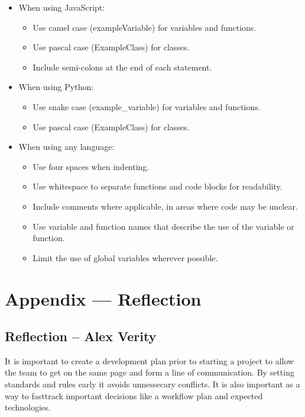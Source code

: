 \documentclass{article}
\begin{document}
\begin{itemize}
  \item When using JavaScript:
  \begin{itemize}
    \item Use camel case (exampleVariable) for variables and functions.
    \item Use pascal case (ExampleClass) for classes.
    \item Include semi-colons at the end of each statement.
  \end{itemize}
  \item When using Python:
  \begin{itemize}
    \item Use snake case (example\_variable) for variables and functions.
    \item Use pascal case (ExampleClass) for classes.
  \end{itemize}
  \item When using any language:
  \begin{itemize}
    \item Use four spaces when indenting.
    \item Use whitespace to separate functions and code blocks for readability.
    \item Include comments where applicable, in areas where code may be unclear.
    \item Use variable and function names that describe the use of the variable
    or function.
    \item Limit the use of global variables wherever possible.
  \end{itemize}
\end{itemize}


\newpage{}

\section*{Appendix --- Reflection}

\subsection*{Reflection -- Alex Verity}

It is important to create a development plan prior to starting a project to
allow the team to get on the same page and form a line of communication. By
setting standards and rules early it avoids unnessecary conflicts. It is also
important as a way to fasttrack important decisions like a workflow plan and
expected technologies. \newline
\end{document}

